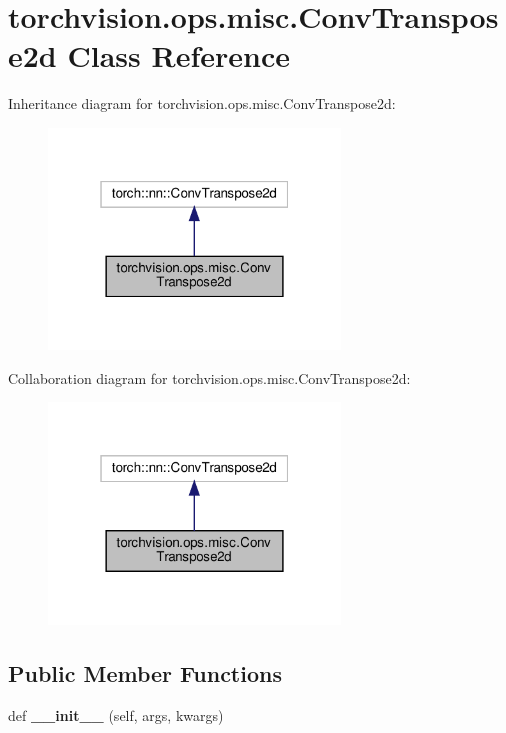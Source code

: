 \hypertarget{classtorchvision_1_1ops_1_1misc_1_1ConvTranspose2d}{}\section{torchvision.\+ops.\+misc.\+Conv\+Transpose2d Class Reference}
\label{classtorchvision_1_1ops_1_1misc_1_1ConvTranspose2d}


Inheritance diagram for torchvision.\+ops.\+misc.\+Conv\+Transpose2d\+:
\nopagebreak
\begin{figure}[H]
\begin{center}
\leavevmode
\includegraphics[width=220pt]{classtorchvision_1_1ops_1_1misc_1_1ConvTranspose2d__inherit__graph}
\end{center}
\end{figure}


Collaboration diagram for torchvision.\+ops.\+misc.\+Conv\+Transpose2d\+:
\nopagebreak
\begin{figure}[H]
\begin{center}
\leavevmode
\includegraphics[width=220pt]{classtorchvision_1_1ops_1_1misc_1_1ConvTranspose2d__coll__graph}
\end{center}
\end{figure}
\subsection*{Public Member Functions}
\begin{DoxyCompactItemize}
\item 
\mbox{\label{classtorchvision_1_1ops_1_1misc_1_1ConvTranspose2d_ad07686301b9bbb98e7ac16cc5c7e75f9}} 
def {\bfseries \+\_\+\+\_\+init\+\_\+\+\_\+} (self, args, kwargs)
\end{DoxyCompactItemize}


